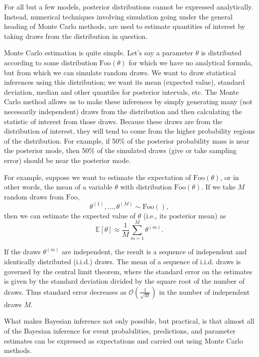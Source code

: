 \documentclass[]{book}
\begin{document}
For all but a few models, posterior distributions cannot be expressed
analytically. Instead, numerical techniques involving simulation going
under the general heading of Monte Carlo methods, are used to estimate
quantities of interest by taking draws from the distribution in
question.

Monte Carlo estimation is quite simple. Let's say a parameter \(\theta\)
is distributed according to some distribution \(\mbox{Foo}(\theta)\) for
which we have no analytical formula, but from which we can simulate
random draws. We want to draw statistical inferences using this
distribution; we want its mean (expected value), standard deviation,
median and other quantiles for posterior intervals, etc. The Monte Carlo
method allows us to make these inferences by simply generating many (not
necessarily independent) draws from the distribution and then
calculating the statistic of interest from those draws. Because these
draws are from the distribution of interest, they will tend to come from
the higher probability regions of the distribution. For example, if 50\%
of the posterior probability mass is near the posterior mode, then 50\%
of the simulated draws (give or take sampling error) should be near the
posterior mode.

For example, suppose we want to estimate the expectation of
\(\mbox{Foo}(\theta)\), or in other words, the mean of a variable
\(\theta\) with distribution \(\mbox{Foo}(\theta)\). If we take \(M\)
random draws from \(\mbox{Foo}\), \[
\theta^{(1)}, \ldots, \theta^{(M)} \sim \mbox{Foo}(),
\] then we can estimate the expected value of \(\theta\) (i.e., its
posterior mean) as \[
\mathbb{E}[\theta]
\approx
\frac{1}{M} \sum_{m=1}^{M} \theta^{(m)}.
\]

If the draws \(\theta^{(m)}\) are independent, the result is a sequence
of independent and identically distributed (i.i.d.) draws. The mean of a
sequence of i.i.d. draws is governed by the central limit theorem, where
the standard error on the estimates is given by the standard deviation
divided by the square root of the number of draws. Thus standard error
decreases as \(\mathcal{O}(\frac{1}{\sqrt{M}})\) in the number of
independent draws \(M\).

What makes Bayesian inference not only possible, but practical, is that
almost all of the Bayesian inference for event probabilities,
predictions, and parameter estimates can be expressed as expectations
and carried out using Monte Carlo methods.
\end{document}
